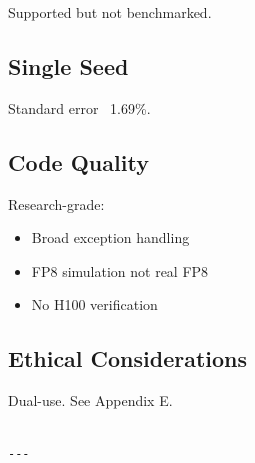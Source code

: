 Supported but not benchmarked.

\subsection{Single Seed}

Standard error ~1.69\%.

\subsection{Code Quality}

Research-grade:
\begin{itemize}
\item Broad exception handling
\item FP8 simulation not real FP8
\item No H100 verification

\end{itemize}
\subsection{Ethical Considerations}

Dual-use. See Appendix E.
\begin{lstlisting}

---
\end{lstlisting}